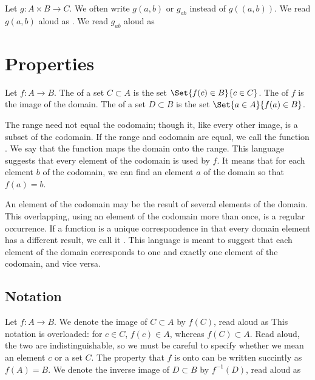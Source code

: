 Let $g: A \times B \to C$.
We often write $g(a,b)$ or $g_{ab}$ instead of $g((a,b))$. We read $g(a, b)$ aloud as .
We read $g_{ab}$ aloud as 


\section{Properties}

Let $f: A \to B$.
The  of a set $C \subset A$ is the set $\Set{f(c) \in B}{c \in C}$.
The  of $f$ is the image of the domain.
The  of a set $D \subset B$ is the set $\Set{a \in A}{f(a) \in B}$.

The range need not equal the codomain; though it, like every other image, is a subset of the codomain.
If the range and codomain are equal, we call the function .
We say that the function maps the domain onto the range.
This language suggests that every element of the codomain is used by $f$.
It means that for each element $b$ of the codomain, we can find an element $a$ of the domain so that $f(a) = b$.

An element of the codomain may be the result of several elements of the domain.
This overlapping, using an element of the codomain more than once, is a regular occurrence.
If a function is a unique correspondence in that every domain element has a different result, we call it .
This language is meant to suggest that each element of the domain corresponds to one and exactly one element of the codomain, and vice versa.

\subsection{Notation}

Let $f: A \to B$.
We denote the image of $C \subset A$ by $f(C)$, read aloud as 
This notation is overloaded: for $c \in C$, $f(c) \in A$, whereas $f(C) \subset A$.
Read aloud, the two are indistinguishable, so we must be careful to specify whether we mean an element $c$ or a set $C$.
The property that $f$ is onto can be written succintly as $f(A) = B$.
We denote the inverse image of $D \subset B$ by $f^{-1}(D)$, read aloud as 



